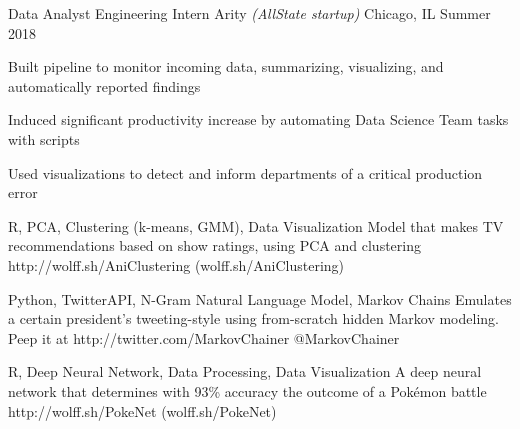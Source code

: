 \documentclass[10pt, letterpaper]{awesome-cv}
\begin{document}
\begin{cventries}
    \cventry
        {Data Analyst Engineering Intern}
        {Arity \textit{(AllState startup)}}
        {Chicago, IL}
        {Summer 2018}
        {\begin{cvitems} 
            \item Built pipeline to monitor incoming data, summarizing, visualizing, and automatically reported findings
            \item Induced significant productivity increase by automating Data Science Team tasks with scripts
            \item Used visualizations to detect and inform departments of a critical production error
            \end{cvitems}}
            
\end{cventries}

\begin{projects}
    {R, PCA, Clustering (k-means, GMM), Data Visualization}
    {Model that makes TV recommendations based on show ratings, using PCA and clustering}
    {http://wolff.sh/AniClustering}
    {(wolff.sh/AniClustering)}
    
    {Python, TwitterAPI, N-Gram Natural Language Model, Markov Chains}
    {Emulates a certain president's tweeting-style using from-scratch hidden Markov modeling. Peep it at}
    {http://twitter.com/MarkovChainer}
    {@MarkovChainer}
    
    {R, Deep Neural Network, Data Processing, Data Visualization}
    {A deep neural network that determines with 93\% accuracy the outcome of a Pokémon battle}
    {http://wolff.sh/PokeNet}
    {(wolff.sh/PokeNet)}
\end{projects}
    
\end{document}
